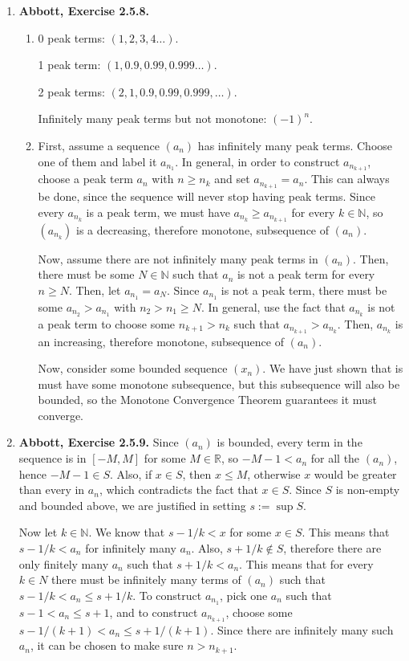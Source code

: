 \documentclass{article}
\newcommand{\N}{\mathbb{N}}
\newcommand{\R}{\mathbb{R}}
\newcommand{\exc}[2][Abbott]{\item \textbf{#1, Exercise #2.}}
\begin{document}
\begin{enumerate}
    \exc{2.5.8}
    \begin{enumerate}
        \item 
        0 peak terms: $(1,2,3,4 \dots)$.
        
        1 peak term: \space $(1,0.9,0.99,0.999 \dots)$.
        
        2 peak terms: $(2,1,0.9,0.99, 0.999, \dots)$.
        
        Infinitely many peak terms but not monotone: $(-1)^n$.
        
        \item First, assume a sequence $(a_n)$ has infinitely many peak terms. Choose one of them and label it $a_{n_1}$. In general, in order to construct $a_{n_{k+1}}$, choose a peak term $a_n$ with $n \geq n_k$ and set $a_{n_{k+1}} = a_n$. This can always be done, since the sequence will never stop having peak terms. Since every $a_{n_k}$ is a peak term, we must have $a_{n_k} \geq a_{n_{k+1}}$ for every $k \in \N$, so $(a_{n_k})$ is a decreasing, therefore monotone, subsequence of $(a_n)$.
        
        Now, assume there are not infinitely many peak terms in $(a_n)$. Then, there must be some $N \in \N$ such that $a_n$ is not a peak term for every $n \geq N$. Then, let $a_{n_1} = a_N$. Since $a_{n_1}$ is not a peak term, there must be some $a_{n_2} > a_{n_1}$ with $n_2 > n_1 \geq N$. In general, use the fact that $a_{n_k}$ is not a peak term to choose some $n_{k+1} > n_k$ such that $a_{n_{k+1}} > a_{n_k}$. Then, $a_{n_k}$ is an increasing, therefore monotone, subsequence of $(a_n)$.
        
        Now, consider some bounded sequence $(x_n)$. We have just shown that is must have some monotone subsequence, but this subsequence will also be bounded, so the Monotone Convergence Theorem guarantees it must converge. 
    \end{enumerate}
    
    \exc{2.5.9}
    Since $(a_n)$ is bounded, every term in the sequence is in $[-M, M]$ for some $M \in \R$, so $-M-1 < a_n$ for all the $(a_n)$, hence $-M-1 \in S$. Also, if $x \in S$, then $x \leq M$, otherwise $x$ would be greater than every in $a_n$, which contradicts the fact that $x \in S$. Since $S$ is non-empty and bounded above, we are justified in setting $s := \sup S$.
    
    Now let $k \in \N$. We know that $s-1/k < x$ for some $x \in S$. This means that $s-1/k < a_n$ for infinitely many $a_n$. Also, $s + 1/k \notin S$, therefore there are only finitely many $a_n$ such that $ s + 1/k < a_n$. This means that for every $k \in N$ there must be infinitely many terms of $(a_n)$ such that $s-1/k < a_n \leq s+1/k$. To construct $a_{n_1}$, pick one $a_n$ such that $s-1 < a_n \leq s+1$, and to construct $a_{n_{k+1}}$, choose some $s-1/(k+1) < a_n \leq s+1/(k+1)$. Since there are infinitely many such $a_n$, it can be chosen to make sure $n > n_{k+1}$.
    

\end{enumerate}
\end{document}
